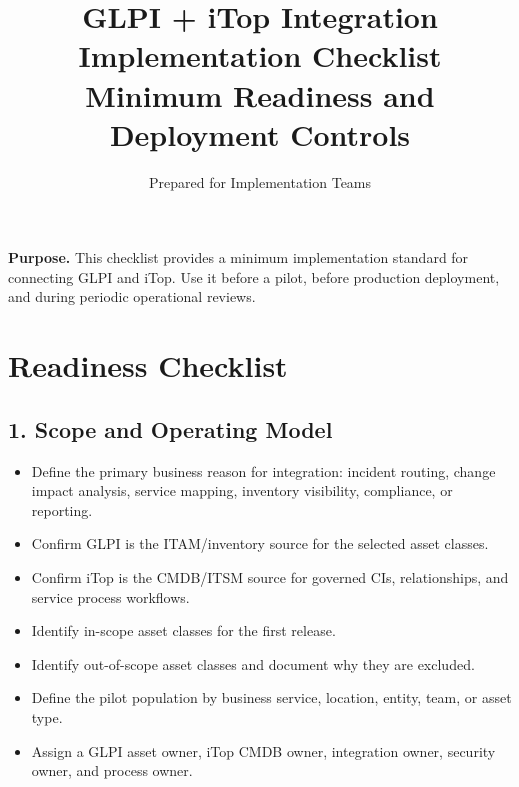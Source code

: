 \documentclass[11pt]{article}
\title{\bfseries\color{Navy} GLPI + iTop Integration Implementation Checklist\\\large Minimum Readiness and Deployment Controls}
\author{Prepared for Implementation Teams}
\date{\docversion}
\newcommand{\checkbox}{\fbox{\rule{0pt}{1.1ex}\rule{1.1ex}{0pt}}}
\begin{document}
\maketitle
\thispagestyle{fancy}

\begin{purposebox}
\textbf{Purpose.} This checklist provides a minimum implementation standard for connecting GLPI and iTop. Use it before a pilot, before production deployment, and during periodic operational reviews.
\end{purposebox}

\section{Readiness Checklist}

\subsection{1. Scope and Operating Model}
\begin{itemize}
  \item[\checkbox] Define the primary business reason for integration: incident routing, change impact analysis, service mapping, inventory visibility, compliance, or reporting.
  \item[\checkbox] Confirm GLPI is the ITAM/inventory source for the selected asset classes.
  \item[\checkbox] Confirm iTop is the CMDB/ITSM source for governed CIs, relationships, and service process workflows.
  \item[\checkbox] Identify in-scope asset classes for the first release.
  \item[\checkbox] Identify out-of-scope asset classes and document why they are excluded.
  \item[\checkbox] Define the pilot population by business service, location, entity, team, or asset type.
  \item[\checkbox] Assign a GLPI asset owner, iTop CMDB owner, integration owner, security owner, and process owner.
\end{itemize}
\end{document}
